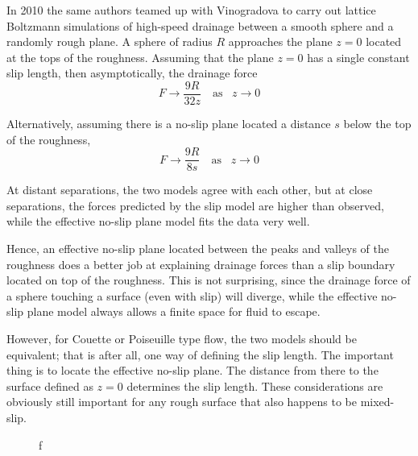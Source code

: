 \documentclass[12pt, a4paper, twoside, openright]{book}
\begin{document}
In 2010 the same authors teamed up with Vinogradova \cite{KunertHartingVinogradova2010} to carry out lattice Boltzmann simulations of high-speed drainage between a smooth sphere and a randomly rough plane.  A sphere of radius $R$ approaches the plane $z=0$ located at the tops of the roughness.  Assuming that the plane $z=0$ has a single constant slip length, then asymptotically, the drainage force
\[ F \rightarrow \frac{9R}{32z} \quad \text{as} \;\;\; z \rightarrow 0 \]

Alternatively, assuming there is a no-slip plane located a distance $s$ below the top of the roughness,
\[ F \rightarrow \frac{9R}{8s} \quad \text{as} \;\;\; z \rightarrow 0 \]

At distant separations, the two models agree with each other, but at close separations, the forces predicted by the slip model are higher than observed, while the effective no-slip plane model fits the data very well.  

\vspace*{1em}

Hence, an effective no-slip plane located between the peaks and valleys of the roughness does a better job at explaining drainage forces than a slip boundary located on top of the roughness.  This is not surprising, since the drainage force of a sphere touching a surface (even with slip) will diverge, while the effective no-slip plane model always allows a finite space for fluid to escape.

However, for Couette or Poiseuille type flow, the two models should be equivalent; that is after all, one way of defining the slip length.  The important thing is to locate the effective no-slip plane.  The distance from there to the surface defined as $z=0$ determines the slip length.  These considerations are obviously still  important for any rough surface that also happens to be mixed-slip.

\begin{figure}[ht]
\centering
{}
\caption{f}\label{f}
\end{figure}
\end{document}
